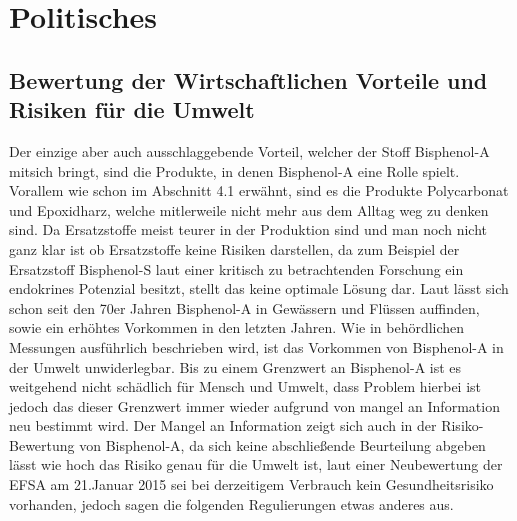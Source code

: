 \section{Politisches}
\subsection{Bewertung der Wirtschaftlichen Vorteile und Risiken für die Umwelt}
Der einzige aber auch ausschlaggebende Vorteil, welcher der Stoff Bisphenol-A mitsich bringt,
sind die Produkte, in denen Bisphenol-A eine Rolle spielt. Vorallem wie schon im
Abschnitt 4.1 erwähnt, sind es die Produkte Polycarbonat und Epoxidharz, welche
mitlerweile nicht mehr aus dem Alltag weg zu denken sind. Da Ersatzstoffe meist teurer
in der Produktion sind und man noch nicht ganz klar ist ob Ersatzstoffe
keine Risiken darstellen, da zum Beispiel der Ersatzstoff Bisphenol-S laut einer
kritisch zu betrachtenden Forschung ein endokrines Potenzial besitzt\cite{Ersatzstoffe},
stellt das keine optimale Lösung dar.
Laut \cite{Umweltbundesamt2016} lässt sich schon seit den 70er Jahren Bisphenol-A
in Gewässern und Flüssen auffinden, sowie ein erhöhtes Vorkommen in den letzten Jahren.
Wie in behördlichen Messungen ausführlich beschrieben wird, ist das Vorkommen von
Bisphenol-A in der Umwelt unwiderlegbar. Bis zu einem Grenzwert an Bisphenol-A ist es
weitgehend nicht schädlich für Mensch und Umwelt, dass Problem hierbei ist jedoch
das dieser Grenzwert immer wieder aufgrund von mangel an Information neu bestimmt wird.
Der Mangel an Information zeigt sich auch in der Risiko-Bewertung von Bisphenol-A, da sich keine abschließende Beurteilung abgeben lässt wie hoch das Risiko genau für die Umwelt ist, laut einer Neubewertung der EFSA am 21.Januar 2015 sei bei derzeitigem Verbrauch kein Gesundheitsrisiko vorhanden, jedoch sagen die folgenden Regulierungen etwas anderes aus.
